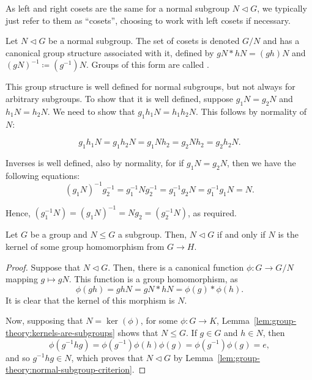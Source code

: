 \documentclass[12pt]{report}
\begin{document}
As left and right cosets are the same for a normal subgroup \(N \triangleleft G\), we typically just refer to them as ``cosets'', choosing to work with left cosets if necessary.

\begin{definition}
  \label{def:group-theory:quotient-group}
  Let \(N \triangleleft G\) be a normal subgroup. The set of cosets is denoted \(G / N\) and has a canonical group structure associated with it, defined by \(gN * hN = (gh)N\) and \((gN)^{-1} \coloneqq (g^{-1})N\). Groups of this form are called .
\end{definition}

This group structure is well defined for normal subgroups, but not always for arbitrary subgroups.
%
To show that it is well defined, suppose \(g_{1}N = g_{2}N\) and \(h_{1}N = h_{2}N\).
%
We need to show that \(g_{1}h_{1}N = h_{1}h_{2}N\).
%
This follows by normality of \(N\):

\[g_{1}h_{1} N = g_{1} h_{2}N =g_{1}Nh_{2} = g_{2}Nh_{2} = g_{2}h_{2}N.\]

Inverses is well defined, also by normality, for if \(g_{1}N = g_{2}N\), then we have the following equations:
\[(g_{1}N)^{-1}g^{-1}_{2} = g_{1}^{-1}Ng^{-1}_{2} = g_{1}^{-1}g_{2}N = g^{-1}_{1}g_{1}N = N.\]

Hence, \((g^{-1}_{1}N) = (g_{1}N)^{-1} = Ng_{2} = (g^{-1}_{2}N)\), as required.


\begin{theorem}
  Let \(G\) be a group and \(N \leq G\) a subgroup.
  Then, \(N \triangleleft G\) if and only if \(N\) is the kernel of some group homomorphism from \(G \to H\).
\end{theorem}

\begin{proof}
  Suppose that \(N \triangleleft G\).
  Then, there is a canonical function \(\phi: G \to G/N\) mapping \(g \mapsto gN\).
  This function is a group homomorphism, as
  \[\phi(gh) = ghN = gN * hN = \phi(g) * \phi(h). \]
  It is clear that the kernel of this morphism is \(N\).

  Now, supposing that \(N = \ker(\phi)\), for some \(\phi : G \to K\), Lemma~\ref{lem:group-theory:kernels-are-subgroups} shows that \(N \leq G\).
  If \(g \in G\) and \(h \in N\), then
  \[\phi(g^{-1}h g) = \phi(g^{-1}) \phi(h) \phi(g) = \phi(g^{-1})\phi(g) = e,\]
  and so \(g^{-1}h g \in N\), which proves that \(N \triangleleft G\) by Lemma~\ref{lem:group-theory:normal-subgroup-criterion}.
\end{proof}
\end{document}
